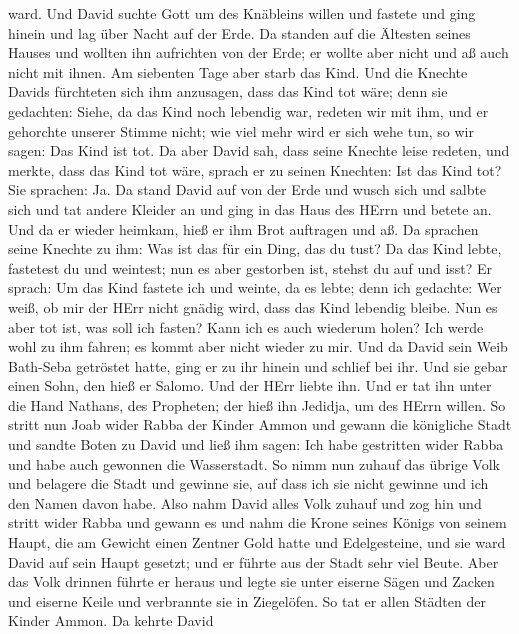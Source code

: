 ward.  Und David suchte Gott um des Knäbleins willen und
fastete und ging hinein und lag über Nacht auf der Erde. 
Da standen auf die Ältesten seines Hauses und wollten ihn aufrichten von
der Erde; er wollte aber nicht und aß auch nicht mit ihnen.
 Am siebenten Tage aber starb das Kind. Und die Knechte
Davids fürchteten sich ihm anzusagen, dass das Kind tot wäre; denn sie
gedachten: Siehe, da das Kind noch lebendig war, redeten wir mit ihm,
und er gehorchte unserer Stimme nicht; wie viel mehr wird er sich wehe
tun, so wir sagen: Das Kind ist tot.  Da aber David sah,
dass seine Knechte leise redeten, und merkte, dass das Kind tot wäre,
sprach er zu seinen Knechten: Ist das Kind tot? Sie sprachen: Ja.
 Da stand David auf von der Erde und wusch sich und salbte
sich und tat andere Kleider an und ging in das Haus des HErrn und betete
an. Und da er wieder heimkam, hieß er ihm Brot auftragen und aß.
 Da sprachen seine Knechte zu ihm: Was ist das für ein
Ding, das du tust? Da das Kind lebte, fastetest du und weintest; nun es
aber gestorben ist, stehst du auf und isst?  Er sprach: Um
das Kind fastete ich und weinte, da es lebte; denn ich gedachte: Wer
weiß, ob mir der HErr nicht gnädig wird, dass das Kind lebendig bleibe.
 Nun es aber tot ist, was soll ich fasten? Kann ich es auch
wiederum holen? Ich werde wohl zu ihm fahren; es kommt aber nicht wieder
zu mir.  Und da David sein Weib Bath-Seba getröstet hatte,
ging er zu ihr hinein und schlief bei ihr. Und sie gebar einen Sohn, den
hieß er Salomo. Und der HErr liebte ihn.  Und er tat ihn
unter die Hand Nathans, des Propheten; der hieß ihn Jedidja, um des
HErrn willen.  So stritt nun Joab wider Rabba der Kinder
Ammon und gewann die königliche Stadt  und sandte Boten zu
David und ließ ihm sagen: Ich habe gestritten wider Rabba und habe auch
gewonnen die Wasserstadt.  So nimm nun zuhauf das übrige
Volk und belagere die Stadt und gewinne sie, auf dass ich sie nicht
gewinne und ich den Namen davon habe.  Also nahm David
alles Volk zuhauf und zog hin und stritt wider Rabba und gewann es
 und nahm die Krone seines Königs von seinem Haupt, die am
Gewicht einen Zentner Gold hatte und Edelgesteine, und sie ward David
auf sein Haupt gesetzt; und er führte aus der Stadt sehr viel Beute.
 Aber das Volk drinnen führte er heraus und legte sie unter
eiserne Sägen und Zacken und eiserne Keile und verbrannte sie in
Ziegelöfen. So tat er allen Städten der Kinder Ammon. Da kehrte David
